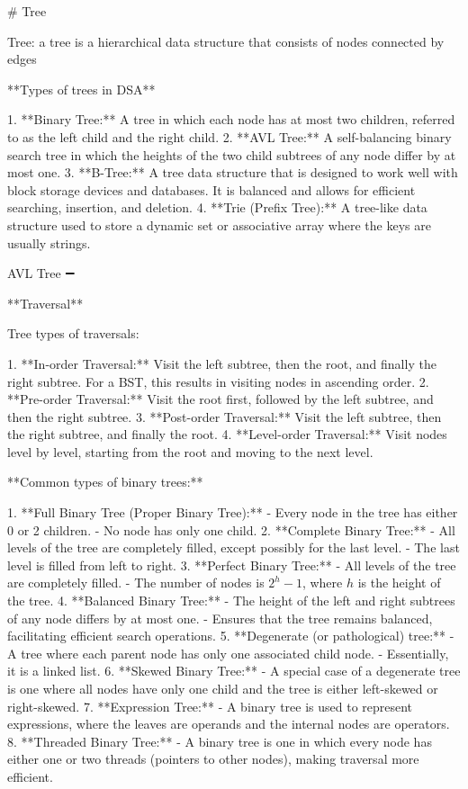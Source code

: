 # Tree

Tree:  a tree is a hierarchical data structure that consists of nodes connected by edges

**Types of trees in DSA**

1. **Binary Tree:** A tree in which each node has at most two children, referred to as the left child and the right child.
2. **AVL Tree:** A self-balancing binary search tree in which the heights of the two child subtrees of any node differ by at most one.
3. **B-Tree:** A tree data structure that is designed to work well with block storage devices and databases. It is balanced and allows for efficient searching, insertion, and deletion.
4. **Trie (Prefix Tree):** A tree-like data structure used to store a dynamic set or associative array where the keys are usually strings.

AVL Tree ➖

**Traversal** 

Tree types of traversals:

1. **In-order Traversal:** Visit the left subtree, then the root, and finally the right subtree. For a BST, this results in visiting nodes in ascending order.
2. **Pre-order Traversal:** Visit the root first, followed by the left subtree, and then the right subtree.
3. **Post-order Traversal:** Visit the left subtree, then the right subtree, and finally the root.
4. **Level-order Traversal:** Visit nodes level by level, starting from the root and moving to the next level.

 **Common types of binary trees:**

1. **Full Binary Tree (Proper Binary Tree):**
    - Every node in the tree has either 0 or 2 children.
    - No node has only one child.
2. **Complete Binary Tree:**
    - All levels of the tree are completely filled, except possibly for the last level.
    - The last level is filled from left to right.
3. **Perfect Binary Tree:**
    - All levels of the tree are completely filled.
    - The number of nodes is \(2^h - 1\), where \(h\) is the height of the tree.
4. **Balanced Binary Tree:**
    - The height of the left and right subtrees of any node differs by at most one.
    - Ensures that the tree remains balanced, facilitating efficient search operations.
5. **Degenerate (or pathological) tree:**
    - A tree where each parent node has only one associated child node.
    - Essentially, it is a linked list.
6. **Skewed Binary Tree:**
    - A special case of a degenerate tree is one where all nodes have only one child and the tree is either left-skewed or right-skewed.
7. **Expression Tree:**
    - A binary tree is used to represent expressions, where the leaves are operands and the internal nodes are operators.
8. **Threaded Binary Tree:**
    - A binary tree is one in which every node has either one or two threads (pointers to other nodes), making traversal more efficient.

